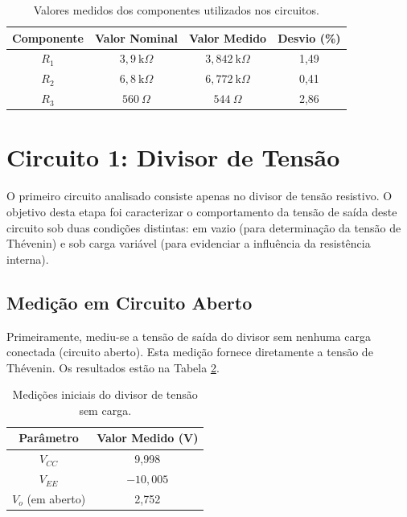 \begin{table}[H]
    \centering
    \ABNTEXfontereduzida
    \caption{Valores medidos dos componentes utilizados nos circuitos.}
    \label{tab:componentes_medidos}
    \begin{tabular}{c|c|c|c}
        \hline
        \textbf{Componente} & \textbf{Valor Nominal} & \textbf{Valor Medido} & \textbf{Desvio (\%)} \\ \hline
        $R_1$ & $3{,}9~\text{k}\Omega$ & $3{,}842~\text{k}\Omega$ & 1,49 \\ [3pt]
        $R_2$ & $6{,}8~\text{k}\Omega$ & $6{,}772~\text{k}\Omega$ & 0,41 \\ [3pt]
        $R_3$ & $560~\Omega$ & $544~\Omega$ & 2,86 \\ [3pt]
        \hline
    \end{tabular}
\end{table}

\section{Circuito 1: Divisor de Tensão}
O primeiro circuito analisado consiste apenas no divisor de tensão resistivo. O objetivo desta etapa foi caracterizar o comportamento da tensão de saída deste circuito sob duas condições distintas: em vazio (para determinação da tensão de Thévenin) e sob carga variável (para evidenciar a influência da resistência interna).
\subsection{Medição em Circuito Aberto}

Primeiramente, mediu-se a tensão de saída do divisor sem nenhuma carga conectada (circuito aberto). Esta medição fornece diretamente a tensão de Thévenin. Os resultados estão na Tabela \ref{tab:divisor_aberto}.

\begin{table}[H]
    \centering
    \ABNTEXfontereduzida
    \caption{Medições iniciais do divisor de tensão sem carga.}
    \label{tab:divisor_aberto}
    \begin{tabular}{c|c}
        \hline
        \textbf{Parâmetro} & \textbf{Valor Medido (V)} \\ \hline
        $V_{CC}$ & 9,998 \\ [3pt]
        $V_{EE}$ & $-10{,}005$ \\ [3pt]
        $V_o$ (em aberto) & 2,752 \\ [3pt]
        \hline
    \end{tabular}
\end{table}


